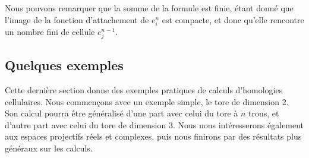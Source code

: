 Nous pouvons remarquer que la somme de la formule est finie, étant donné que l'image de la fonction d'attachement de $e_i^n$ est compacte, et donc qu'elle rencontre un nombre fini de cellule $e_j^{n-1}$.

\subsection{Quelques exemples}

Cette dernière section donne des exemples pratiques de calculs d'homologies cellulaires. Nous commençons avec un exemple simple, le tore de dimension 2. Son calcul pourra être généralisé d'une part avec celui du tore à $n$ trous, et d'autre part avec celui du tore de dimension 3. Nous nous intéresserons également aux espaces projectifs réels et complexes, puis nous finirons par des résultats plus généraux sur les calculs.

